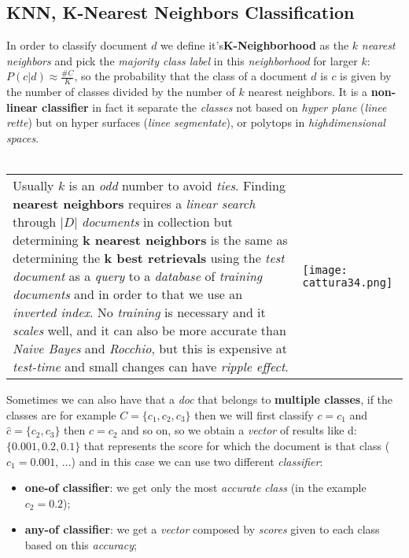\documentclass{article}
\begin{document}
\subsection{KNN, K-Nearest Neighbors Classification}
In order to classify document $d$ we define it's\textbf{K-Neighborhood} as the $k$ \emph{nearest neighbors} and pick the \emph{majority class label} in this \emph{neighborhood} for larger $k$: $P(c|d) \approx \frac{\#C}{K}$, so the probability that the class of a document $d$ is $c$ is given by the number of classes divided by the number of $k$ nearest neighbors. It is a \textbf{non-linear classifier} in fact it separate the \emph{classes} not based on \emph{hyper plane} (\emph{linee rette}) but on hyper surfaces (\emph{linee segmentate}), or polytops in \emph{highdimensional spaces}.
\\\\
\begin{tabular}{L{8cm} C{7cm}}
Usually $k$ is an \emph{odd} number to avoid \emph{ties}. Finding \textbf{nearest neighbors} requires a \emph{linear search} through $|D|$ \emph{documents} in collection but determining\textbf{ k nearest neighbors} is the same as determining the\textbf{ k best retrievals} using the \emph{test document} as a \emph{query} to a \emph{database} of \emph{training documents }and in order to that we use an \emph{inverted index}. No \emph{training} is necessary and it \emph{scales} well, and it can also be more accurate than \emph{Naive Bayes} and \emph{Rocchio}, but this is expensive at \emph{test-time} and small changes can have \emph{ripple effect}. 
& \texttt{[image: cattura34.png]}
\end{tabular}
Sometimes we can also have that a \emph{doc} that belongs to \textbf{multiple classes}, if the classes are for example $C = \{ c_1, c_2, c_3 \}$ then we will first classify $c=c_1$ and $\hat{c} = \{c_2,c_3\}$ then $c=c_2$ and so on, so we obtain a \emph{vector} of results like d: $\{0.001, 0.2, 0.1\}$ that represents the score for which the document is that class ($c_1 = 0.001$, ...) and in this case we can use two different \emph{classifier}:
\begin{itemize}
\item \textbf{one-of classifier}: we get only the most \emph{accurate class} (in the example $c_2 = 0.2$);
\item \textbf{any-of classifier}: we get a \emph{vector} composed by \emph{scores} given to each class based on this \emph{accuracy};
\end{itemize}
\end{document}

